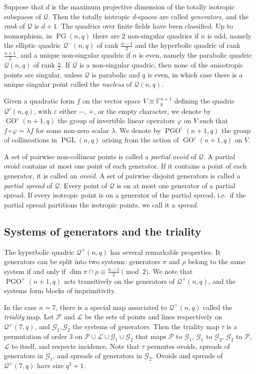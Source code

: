\documentclass[a4paper]{article}
\theoremstyle{definition}
\newcommand{\eps}{\varepsilon}
\renewcommand{\phi}{\varphi}
\newcommand{\FF}{\mathbb F}
\newcommand{\fq}{\FF_q}
\newcommand{\mg}{\mathcal G}
\newcommand{\ml}{\mathcal L}
\renewcommand{\mp}{\mathcal P}
\newcommand{\mq}{\mathcal Q}
\DeclareMathOperator{\PG}{PG}
\newcommand{\pg}{\PG}
\DeclareMathOperator{\PGL}{PGL}
\newcommand{\pgl}{\PGL}
\DeclareMathOperator{\PGO}{PGO}
\DeclareMathOperator{\GO}{GO}
\begin{document}
Suppose that $d$ is the maximum projective dimension of the totally isotropic subspaces of $\mq$.
Then the totally isotropic $d$-spaces are called \emph{generators}, and the \emph{rank} of $\mq$ is $d+1$.
The quadrics over finite fields have been classified.
Up to isomorphism, in $\pg(n,q)$ there are $2$ non-singular quadrics if $n$ is odd, namely the elliptic quadric $\mq^-(n,q)$ of rank $\frac{n-1}2$ and the hyperbolic quadric of rank $\frac{n+1}2$, and a unique non-singular quadric if $n$ is even, namely the parabolic quadric $\mq(n,q)$ of rank $\frac n2$.
If $\mq$ is a non-singular quadric, then none of the anisotropic points are singular, unless $\mq$ is parabolic and $q$ is even, in which case there is a unique singular point called the \emph{nucleus} of $\mq(n,q)$.

Given a quadratic form $f$ on the vector space $V \cong \fq^{n+1}$ defining the quadric $\mq^\eps(n,q)$, with $\eps$ either $-$, $+$, or the empty character, we denote by $\GO^\eps(n+1,q)$ the group of invertible linear operators $\phi$ on $V$ such that $f \circ \phi = \lambda f$ for some non-zero scalar $\lambda$.
We denote by $\PGO^\eps(n+1,q)$ the group of collineations in $\pgl(n,q)$ arising from the action of $\GO^\eps(n+1,q)$ on $V$.

A set of pairwise non-collinear points is called a \emph{partial ovoid} of $\mq$.
A partial ovoid contains at most one point of each generator.
If it contains a point of each generator, it is called an \emph{ovoid}.
A set of pairwise disjoint generators is called a \emph{partial spread} of $\mq$.
Every point of $\mq$ is on at most one generator of a partial spread.
If every isotropic point is on a generator of the partial spread, i.e.\ if the partial spread partitions the isotropic points, we call it a \emph{spread}.

\subsection{Systems of generators and the triality}

The hyperbolic quadric $\mq^+(n,q)$ has several remarkable properties.
It generators can be split into two systems: generators $\pi$ and $\rho$ belong to the same system if and only if $\dim \pi \cap \rho \equiv \frac{n-1}2 \pmod 2$.
We note that $\PGO^+(n+1,q)$ acts transitively on the generators of $\mq^+(n,q)$, and the systems form blocks of imprimitivity.

In the case $n = 7$, there is a special map associated to $\mq^+(n,q)$ called the \emph{triality} map.
Let $\mp$ and $\ml$ be the sets of points and lines respectively on $\mq^+(7,q)$, and $\mg_1, \mg_2$ the systems of generators.
Then the triality map $\tau$ is a permutation of order 3 on $\mp \cup \ml \cup \mg_1 \cup \mg_2$ that maps $\mp$ to $\mg_1$, $\mg_1$ to $\mg_2$, $\mg_2$ to $\mp$, $\ml$ to itself, and respects incidence.
Note that $\tau$ permutes ovoids, spreads of generators in $\mg_1$, and spreads of generators in $\mg_2$.
Ovoids and spreads of $\mq^+(7,q)$ have size $q^3+1$.
\end{document}
